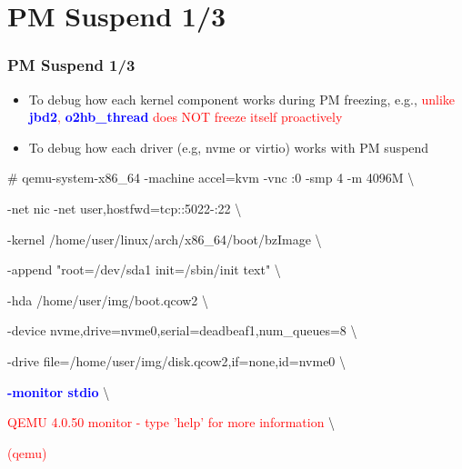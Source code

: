 \documentclass[aspectratio=169]{beamer}
\begin{document}

\section{PM Suspend 1/3}
\begin{frame}
\frametitle{PM Suspend 1/3}
\begin{itemize}
	\item To debug how each kernel component works during PM freezing, e.g., \textcolor{red}{unlike \textbf{\textcolor{blue}{jbd2}}, \textbf{\textcolor{blue}{o2hb\_thread}} does \textcolor{red}{NOT} freeze itself proactively}
\item To debug how each driver (e.g, nvme or virtio) works with PM suspend
\end{itemize}
\begin{block}{}

\# qemu-system-x86\_64 -machine accel=kvm -vnc :0 -smp 4 -m 4096M \textbackslash

-net nic -net user,hostfwd=tcp::5022-:22 \textbackslash

-kernel /home/user/linux/arch/x86\_64/boot/bzImage \textbackslash
	
-append "root=/dev/sda1 init=/sbin/init text" \textbackslash

-hda /home/user/img/boot.qcow2 \textbackslash

-device nvme,drive=nvme0,serial=deadbeaf1,num\_queues=8 \textbackslash

-drive file=/home/user/img/disk.qcow2,if=none,id=nvme0 \textbackslash

\textbf{\textcolor{blue}{-monitor stdio}} \textbackslash

\textcolor{red}{QEMU 4.0.50 monitor - type 'help' for more information} \textbackslash

\textcolor{red}{(qemu)}

\end{block}
\end{frame}

\end{document}
